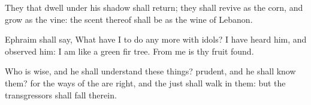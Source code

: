 \Verse They that dwell under his shadow shall return; they shall revive as the corn, and grow as the vine: the scent thereof shall be as the wine of Lebanon.

\Verse Ephraim shall say, What have I to do any more with idols? I have heard him, and observed him: I am like a green fir tree. From me is thy fruit found.

\Verse Who is wise, and he shall understand these things? prudent, and he shall know them? for the ways of the \LORD are right, and the just shall walk in them: but the transgressors shall fall therein.

